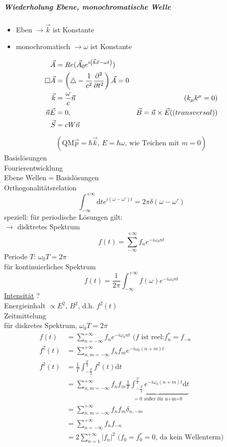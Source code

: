 \documentclass[a4paper]{article}
\newcommand*\laplace{\mathop{}\!\mathbin\bigtriangleup}
\newcommand*\dalembert{\mathop{}\!\mathbin\Box}
\begin{document}
\subparagraph{Wiederholung Ebene, monochromatische Welle}
\begin{itemize}
  \item Eben $\rightarrow \vec{k}$ ist Konstante
  \item monochromatisch $\rightarrow \omega$ ist Konstante
\end{itemize}
\begin{align}
\vec{A}&=Re(\vec{A}_0 e^{i\left(\vec{k}\vec{x}-\omega t\right)})\\
\dalembert \vec{A}&=\left( \laplace -\frac{1}{c^2}\frac{\partial^2}{\partial
t^2} \right)\vec{A}=0\\
\vec{k}&=\frac{\omega}{c}\vec{n} &\left( k_\mu k^\mu=0 \right)\\
\vec{n}\vec{E}&=0, &\vec{B}=\vec{n}\times\vec{E} \text(  (transversal))\\
\vec{S}&=cW\vec{n}
\end{align}
\begin{align}
\left( \text{QM} \vec{p}=\hbar\vec{k}\text{, }E=\hbar\omega \text{, wie Teichen
mit }m=0 \right)
\end{align}
Basislösungen\\
Fourierentwicklung\\
Ebene Wellen$=$Basislösungen\\
Orthogonalitätsrelation
\begin{equation}
\int_{-\infty}^{+\infty} \mathrm{d}t e^{i(\omega-\omega')t}=2\pi\delta(\omega-\omega')
\end{equation}
speziell: für periodische Lösungen gilt:\\
$\rightarrow$ disktretes Spektrum
\begin{equation}
f(t)=\sum_{-\infty}^{+\infty} f_n  e^{-i\omega_0 n t}
\end{equation}
Periode $T$: $\omega_0 T=2\pi$\\
für kontinuierliches Spektrum
\begin{equation}
f(t)=\frac{1}{2\pi}\int_{-\infty}^{+\infty} f(\omega)  e^{-i\omega_0 n t}
\end{equation} 
\underline{Intensität} ?\\
Energieinhalt $\propto E^2$, $B^2$, d.h. $f^2(t)$\\
Zeitmittelung\\
für diskretes Spektrum, $\omega_0 T=2\pi$
\begin{align}
f(t)&=\sum_{n=-\infty}^{+\infty} f_n  e^{-i\omega_0 n t} \text{  (}f \text{ ist
reel:}f_n^*=f_{-n}\\
f^2(t)&=\sum_{n,m=-\infty}^{+\infty} f_n f_m  e^{-i\omega_0 (n+m) t}\\
\overline{f^2(t)}&=\frac{1}{T} \int_{-\frac{T}{2}}^{\frac{T}{2}} f^2(t) \mathrm{d}t\\
&=\sum_{n,m=-\infty}^{+\infty} f_n f_m \underbrace{\frac{1}{T}
\int_{-\frac{T}{2}}^{\frac{T}{2}} e^{-i\omega_0 (n+m) t}\mathrm{d}t}_{=0 \text{ außer
für n+m=0}}\\
&=\sum_{n,m=-\infty}^{+\infty} f_n f_m \delta_{n,-m}\\
&=\sum_{n=-\infty}^{+\infty} f_n f_{-n}\\
&=2\sum_{n=1}^{+\infty} |f_n|^2 \text{ (} f_0=f_0^*=0\text{, da kein
Wellenterm)}
\end{align}
\end{document}
